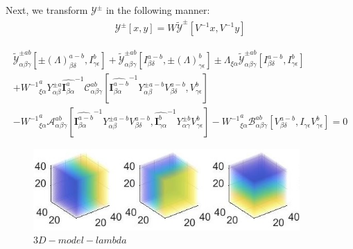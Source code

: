 \documentclass{Note}
\begin{document}
Next, we transform $\mathcal{Y}^{\pm}$ in the following manner:
\begin{equation}
\begin{aligned}
\mathcal{Y}^{\pm}[x,y]=W\widetilde{\mathcal{Y}}^{\pm}[V^{-1}x,V^{-1}y]
\end{aligned}
\end{equation}

\begin{equation}
\begin{aligned}
\widetilde{\mathcal{Y}}_{\alpha\beta\gamma}^{\pm ab} [\pm {(\Lambda)}_{\beta\delta}^{a-b} ,I_{\gamma\epsilon} ^{b}]+\widetilde{\mathcal{Y}}_{\alpha\beta\gamma}^{\pm ab}[I_{\beta\delta}^{a-b},\pm {(\Lambda)}_{\gamma\epsilon}^{b}]
\pm \Lambda_{\xi\alpha} \widetilde{\mathcal{Y}}_{\alpha\beta\gamma}^{\pm ab}[I_{\beta\delta}^{a-b},I_{\gamma\epsilon}^{b}]\\
+{W^{-1}}_{\xi\alpha}^a Y_{\alpha\beta}^{\pm a}{\widehat{\textbf{I}_{\beta \alpha}^a}}^{-1}  \mathcal{C}_{\alpha\beta\gamma}^{ab}[{\widehat{\textbf{I}_{\beta \alpha}^{a-b}}}^{-1}  Y_{\alpha\beta}^{\pm a-b} V_{\beta\delta}^{a-b}, V_{\gamma\epsilon}^{b} ]\\
-{W^{-1}}_{\xi\alpha}^a \mathcal{A}_{\alpha\beta\gamma}^{ab}[{\widehat{\textbf{I}_{\beta \alpha}^{a-b}}}^{-1}  Y_{\alpha\beta}^{\pm a-b}V_{\beta\delta}^{a-b} ,{\widehat{\textbf{I}_{\gamma \alpha}^{b}}}^{-1}  Y_{\alpha\gamma}^{\pm b} V_{\gamma\epsilon}^{b}] -{W^{-1}}_{\xi\alpha}^a \mathcal{B}_{\alpha\beta\gamma}^{ab}[V_{\beta\delta}^{a-b} ,I_{\gamma\epsilon}V_{\gamma\epsilon}^{b} ]=0
\end{aligned}
\end{equation}

\begin{figure}
  \centerline{\includegraphics[width=4in]{3D-model-lambda.jpg}}
  \caption{$3D-model-lambda$}
  \end{figure}
\end{document}
